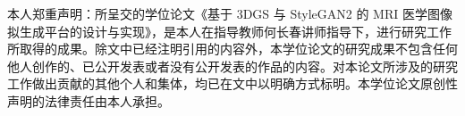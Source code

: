 \thispagestyle{thesis-decl}


\vspace{0.4em}

\begin{thesisdeclbody}
本人郑重声明：所呈交的学位论文《基于 3DGS 与 StyleGAN2 的 MRI 医学图像拟生成平台的设计与实现》，是本人在指导教师何长春讲师指导下，进行研究工作所取得的成果。除文中已经注明引用的内容外，本学位论文的研究成果不包含任何他人创作的、已公开发表或者没有公开发表的作品的内容。对本论文所涉及的研究工作做出贡献的其他个人和集体，均已在文中以明确方式标明。本学位论文原创性声明的法律责任由本人承担。
\end{thesisdeclbody}

\vspace{0.25em}


\thesisdeclseparator
